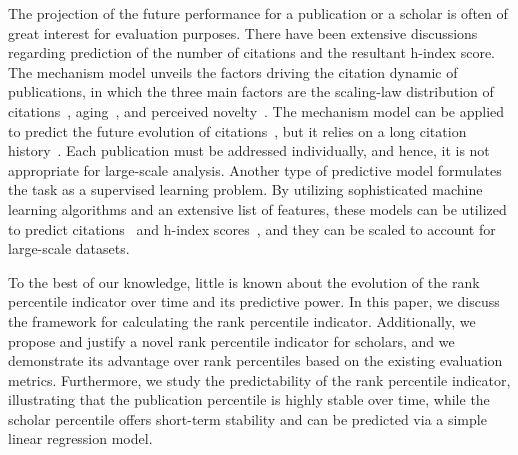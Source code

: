 The projection of the future performance for a publication or a scholar is often of great interest for evaluation purposes. There have been extensive discussions regarding prediction of the number of citations and the resultant h-index score. The mechanism model unveils the factors driving the citation dynamic of publications, in which the three main factors are the scaling-law distribution of citations~\cite{price1976general,barabasi1999emergence,peterson2010nonuniversal,Radicchi2008}, aging~\cite{barabasi1999emergence,albert2002statistical,hajra2006modelling,dorogovtsev2000evolution}, and perceived novelty~\cite{Wang2013}. The mechanism model can be applied to predict the future evolution of citations~\cite{Wang2013}, but it relies on a long citation history~\cite{wang2014science,wang2014response}. Each publication must be addressed individually, and hence, it is not appropriate for large-scale analysis. Another type of predictive model formulates the task as a supervised learning problem. By utilizing sophisticated machine learning algorithms and an extensive list of features, these models can be utilized to predict citations~\cite{fu2008models,lokker2008prediction,ibanez2009predicting,mazloumian2012predicting,stern2014high,weihs2017learning} and h-index scores~\cite{hirsch2007does,acuna2012future,penner2013predictability,weihs2017learning}, and they can be scaled to account for large-scale datasets. 

To the best of our knowledge, little is known about the evolution of the rank percentile indicator over time and its predictive power. In this paper, we discuss the framework for calculating the rank percentile indicator. Additionally, we propose and justify a novel rank percentile indicator for scholars, and we demonstrate its advantage over rank percentiles based on the existing evaluation metrics. Furthermore, we study the predictability of the rank percentile indicator, illustrating that the publication percentile is highly stable over time, while the scholar percentile offers short-term stability and can be predicted via a simple linear regression model.


\iffalse
scaling laws~\cite{price1976general,barabasi1999emergence,peterson2010nonuniversal,redner1998popular,redner2004citation,Radicchi2008,stringer2008effectiveness}
aging~\cite{barabasi1999emergence,albert2002statistical,boccaletti2006complex,krapivsky2001organization,newman2009first,hajra2004phase,hajra2005aging,hajra2006modelling,wang2008measuring,dorogovtsev2000evolution,dorogovtsev2001scaling,zhu2003effect}
\fi





